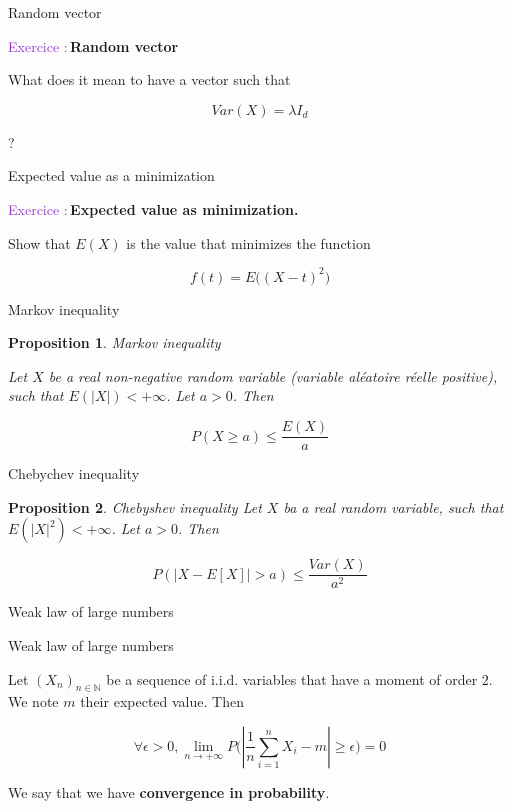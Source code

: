\documentclass[usenames,dvipsnames]{beamer}
\newtheorem*{proposition}{Proposition}
\newcounter{numexos}%
\newcommand{\exercice}[1]{%
\addtocounter{numexos}{1}%
\textcolor{DarkOrchid}{Exercice\,\thenumexos\,:}\,#1%
}
\begin{document}
\begin{frame}{Random vector}
    \exercice{\textbf{Random vector}}

    What does it mean to have a vector such that 

    \begin{equation}
	Var(X) = \lambda I_d
    \end{equation}
    
    ?
\end{frame}

\begin{frame}{Expected value as a minimization}

    \exercice{\textbf{Expected value as minimization.}}

    Show that $E(X)$ is the value that minimizes the function

    \begin{equation}
	f(t)=E\big( (X-t)^2 \big)
    \end{equation}
\end{frame}

\begin{frame}{Markov inequality}
\begin{proposition}{Markov inequality}

    Let $X$ be a real non-negative random variable (variable aléatoire réelle positive), such that $E(|X|)<+\infty$. Let $a>0$. Then

    \begin{equation*}
	P(X\geq a)\leq \frac{E(X)}{a} 
    \end{equation*}
    
\end{proposition}
\end{frame}

\begin{frame}{Chebychev inequality}
\begin{proposition}{Chebyshev inequality}
    Let $X$ ba a real random variable, such that $E(|X|^2)<+\infty$. Let $a>0$. Then

    \begin{equation*}
	P(|X-E[X]|>a)\leq \frac{Var(X)}{a^2} 
    \end{equation*}
\end{proposition}
\end{frame}

\begin{frame}{Weak law of large numbers}
\begin{theorem}{Weak law of large numbers}

    Let $(X_n)_{n\in \mathbb{N} }$ be a sequence of i.i.d. variables that have a moment of order $2$. We note $m$ their expected value. Then

    \begin{equation*}
	\forall \epsilon > 0, \lim_{n\rightarrow+\infty}P\big( |\frac{1}{n} \sum^{n}_{i=1} X_i-m|\geq \epsilon \big)= 0
    \end{equation*}

We say that we have \textbf{{convergence in probability}}.
\end{theorem}
\end{frame}
\end{document}
